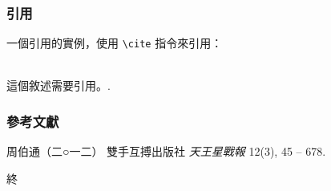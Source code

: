 \documentclass[hyperref={bookmarks=false}]{beamer}
\begin{document}

\begin{frame}[fragile] %
\frametitle{\iyan 引用}
一個引用的實例，使用 \verb|\cite| 指令來引用：\\~

這個敘述需要引用。\cite{p1}.
\end{frame}


\begin{frame}
\frametitle{\iyan 參考文獻}
\footnotesize{
\begin{thebibliography}{99} %
 周伯通（二○一二）
\newblock 雙手互搏出版社
\newblock \emph{天王星戰報} 12(3), 45 -- 678.
\end{thebibliography}
}
\end{frame}


\begin{frame}
\Huge{\centerline{\iyan 終}}
\end{frame}

\end{document}
